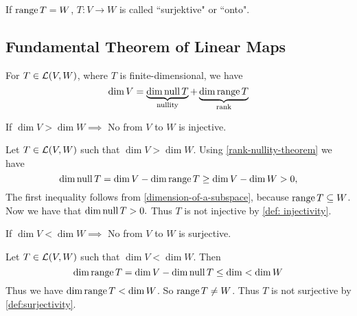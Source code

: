 \setcounter{thm}{18}
\begin{mydef} [surjectivity]
  \label{def:surjectivity}
  If $\operatorname{range} T=W$, $T:V\to W$ is called ``surjektive" or ``onto".
\end{mydef}

\subsection{Fundamental Theorem of Linear Maps}
  \setcounter{thm}{20}
  \begin{thm} 
    \label{rank-nullity-theorem}
    For $T \in {\mathcal{L}(V,W)}$, where $T$ is finite-dimensional, we have
    \begin{equation}
      \dim V =
      \underbrace{ \dim \operatorname{null} T }_{\text{nullity}}
      + \underbrace{\dim \operatorname{range} T}_{\text{rank}}
    \end{equation}
  \end{thm}

  \setcounter{thm}{21}
  \begin{thm} 
    \label{thm: linear-map-to-a-lower-dimensional-space-is-not-injective}
    If $\dim V > \dim W \implies$ No \lm from $V$ to $W$ is injective.
  \end{thm}
  \begin{prf} Let $T\in \mathcal{L}(V,W)$ such that $\dim V > \dim W$. Using \ref{rank-nullity-theorem} we have
    \begin{equation}
      \dim \operatorname{null} T = \dim V - \dim \operatorname{range} T \geq \dim V - \dim W > 0,
    \end{equation}
    The first inequality follows from \ref{dimension-of-a-subspace}, because $\operatorname{range} T \subseteq W$. Now we have that $\dim \operatorname{null} T > 0.$ Thus $T$ is not injective by \autoref{def: injectivity}.
  \end{prf}

  \setcounter{thm}{23}
  \begin{thm} 
    If $\dim V < \dim W \implies$ No \lm from $V$ to $W$ is surjective.
  \end{thm}
  \begin{prf}
    Let $T\in \mathcal{L} (V,W)$ such that $\dim V < \dim W$. Then
    \begin{equation}
      \dim \operatorname{range} T = \dim V - \dim \operatorname{null} T \leq \dim < \dim W
    \end{equation}
    Thus we have $\dim \operatorname{range} T < \dim W$. So $\operatorname{range} T \neq W$. Thus $T$ is not surjective by \autoref{def:surjectivity}.
  \end{prf}
   
